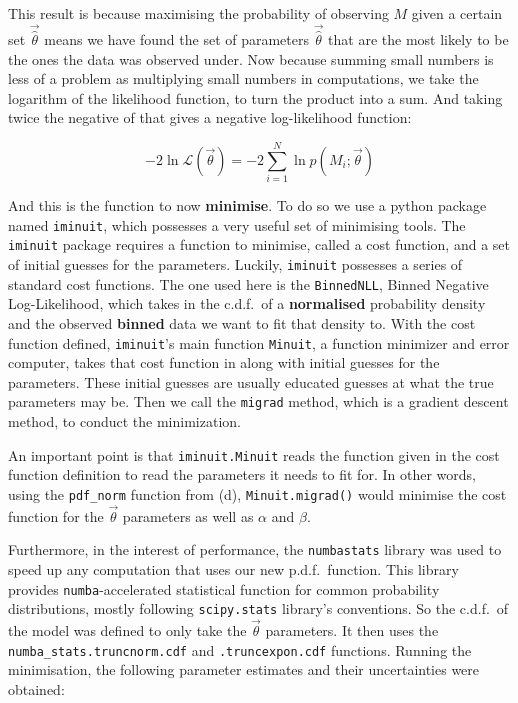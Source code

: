 \documentclass[12pt]{report} %
\begin{document}
This result is because maximising the probability of observing $M$ given a certain set $\vec{\hat{\theta}}$ means we have found the set of parameters $\vec{\hat{\theta}}$ that are the most likely to be the ones the data was observed under. Now because summing small numbers is less of a problem as multiplying small numbers in computations, we take the logarithm of the likelihood function, to turn the product into a sum. And taking twice the negative of that gives a negative log-likelihood function:

\begin{equation}
    -2\ln{\mathcal{L}(\vec{\theta})} = -2\displaystyle \sum_{i=1}^{N} \ln{p(M_{i};\vec{\theta})}
\end{equation}

And this is the function to now \textbf{minimise}. To do so we use a python package named \texttt{iminuit}\cite{iminuitBasics}, which possesses a very useful set of minimising tools. The \texttt{iminuit} package requires a function to minimise, called a cost function, and a set of initial guesses for the parameters. Luckily, \texttt{iminuit} possesses a series of standard cost functions\cite{iminuitCOST}. The one used here is the \texttt{BinnedNLL}, Binned Negative Log-Likelihood, which takes in the c.d.f.\ of a \textbf{normalised} probability density and the observed \textbf{binned} data we want to fit that density to. With the cost function defined, \texttt{iminuit}'s main function \texttt{Minuit}\cite{iminuitMinuit}, a function minimizer and error computer, takes that cost function in along with initial guesses for the parameters. These initial guesses are usually educated guesses at what the true parameters may be. Then we call the \texttt{migrad} method, which is a gradient descent method, to conduct the minimization\cite{iminuitMigrad}.

An important point is that \texttt{iminuit.Minuit} reads the function given in the cost function definition to read the parameters it needs to fit for. In other words, using the \texttt{pdf\_norm} function from (d), \texttt{Minuit.migrad()} would minimise the cost function for the $\vec{\theta}$ parameters as well as $\alpha$ and $\beta$\cite{iminuitBasics}.

Furthermore, in the interest of performance, the \texttt{numba\-stats} library\cite{numba-stats} was used to speed up any computation that uses our new p.d.f.\ function. This library provides \texttt{numba}-accelerated statistical function for common probability distributions, mostly following \texttt{scipy.stats} library's conventions\cite{scipy-stats}. So the c.d.f.\ of the model was defined to only take the $\vec{\theta}$ parameters. It then uses the \texttt{numba\_stats.truncnorm.cdf} and \texttt{.truncexpon.cdf} functions. Running the minimisation, the following parameter estimates and their uncertainties were obtained:  
\end{document}

